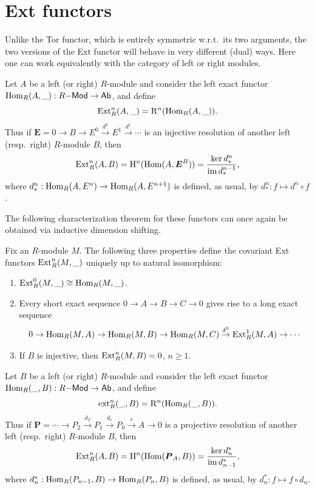 \section{Ext functors}

Unlike the Tor functor, which is entirely symmetric w.r.t.\ its two arguments, the two versions of the Ext functor will behave in very different (dual) ways. Here one can work equivalently with the category of left or right modules.

\begin{defn}
    Let $A$ be a left (or right) $R$-module and consider the left exact functor $\operatorname{Hom}_R(A,\_):R\mathsf{-Mod}\to \mathsf{Ab}$, and define
    \[\operatorname{Ext}_R^n(A,\_)=\mathrm{R}^n(\operatorname{Hom}_R(A,\_)).\]
    Thus if $\bm{E}=0\to B\to E^0\overset{d^0}{\to} E^1\overset{d^1}{\to}\cdots$ is an injective resolution of another left (resp.~right) $R$-module $B$, then
    \[\operatorname{Ext}_R^n(A,B)=\mathrm{H}^n(\operatorname{Hom}(A,\boldsymbol{E}^B))=\frac{\ker d_\ast^n}{\operatorname{im} d_\ast^{n-1}},\]
    where $d_\ast^n:\operatorname{Hom}_R(A,E^n)\to \operatorname{Hom}_R(A,E^{n+1})$ is defined, as usual, by $d_\ast^n:f\mapsto d^n\circ f$.
\end{defn}

The following characterization theorem for these functors can once again be obtained via inductive dimension shifting.

\begin{thm}
    Fix an $R$-module $M$. The following three properties define the covariant Ext functors $\operatorname{Ext}_R^n(M,\_)$ uniquely up to natural isomorphism:
    \begin{enumerate}
        \item $\operatorname{Ext}^0_R(M,\_)\cong\operatorname{Hom}_R(M,\_)$.
        \item Every short exact sequence $0\to A\to B\to C\to 0$ gives rise to a long exact sequence
        \[0\to \operatorname{Hom}_R(M,A)\to \operatorname{Hom}_R(M,B)\to \operatorname{Hom}_R(M,C)\overset{\delta^0}{\to} \operatorname{Ext}^1_R(M,A)\to\cdots \]
        \item If $B$ is injective, then $\operatorname{Ext}_R^n(M,B)=0$, $n\geq 1$.
    \end{enumerate}
\end{thm}


\begin{defn}
    Let $B$ be a left (or right) $R$-module and consider the left exact functor $\operatorname{Hom}_R(\_,B):R\mathsf{-Mod}\to \mathsf{Ab}$, and define
    \[\operatorname{ext}_R^n(\_,B)=\mathrm{R}^n(\operatorname{Hom}_R(\_,B)).\]
    Thus if $\bm{P}=\cdots\to P_2\overset{d_2}\to P_1\overset{d_1}{\to} P_0 \overset{\epsilon}{\to}A\to 0$ is a projective resolution of another left (resp.~right) $R$-module $B$, then
    \[\operatorname{Ext}_R^n(A,B)=\mathrm{H}^n(\operatorname{Hom}(\boldsymbol{P}_A,B))=\frac{\ker d_n^{\ast}}{\operatorname{im} d_{n-1}^\ast},\]
    where $d_n^{\ast}:\operatorname{Hom}_R(P_{n-1},B)\to \operatorname{Hom}_R(P_n,B)$ is defined, as usual, by $d_n^{\ast}:f\mapsto f\circ d_n$.
\end{defn}

